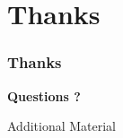 \documentclass[hyperref={pdfpagelabels=false}]{beamer}
\begin{document}
\section*{Thanks}
\begin{frame}
    \frametitle{Thanks}
    \begin{center}
        \textbf{Questions ?}
    \end{center}
\end{frame}
\appendix
{}
\setcounter{finalframe}{\value{framenumber}}

\begin{frame}
\end{frame}

\begin{frame}
    Additional Material
\end{frame}
\setcounter{framenumber}{\value{finalframe}}
\end{document}
